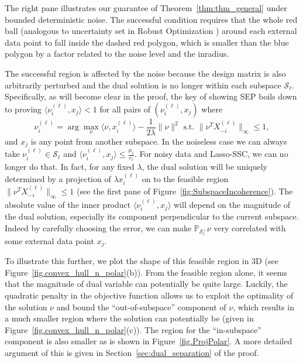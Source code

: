 \documentclass[twoside,11pt]{article}
\numberwithin{equation}{section}
\def\cS{\mathcal{S}}
\begin{document}
The right pane illustrates our guarantee of Theorem~\ref{thm:thm_general} under bounded deterministic noise. The successful condition requires that the whole red ball (analogous to uncertainty set in Robust Optimization \citep{ben1998robust,bertsimas2004price}) around each external data point to fall inside the dashed red polygon, which is smaller than the blue polygon by a factor related to the noise level and the inradius.

The successful region is affected by the noise because the design matrix is also arbitrarily perturbed and the dual solution is no longer within each subspace $\cS_\ell$. Specifically, as will become clear in the proof, the key of showing SEP boils down to proving
$
\langle \nu_i^{(\ell)}, x_j\rangle < 1
$
for all pairs of $(\nu_i^{(\ell)}, x_j)$ where
$$ \nu_i^{(\ell)}=\arg\max_{\nu} \langle \nu, x_i^{(\ell)}\rangle  -\frac{1}{2\lambda}\|\nu\|^2 \text{ s.t. }  \|\nu^TX_{-i}^{(\ell)} \|_\infty \leq 1,$$
and $x_j$ is any point from another subspace. In the noiseless case we can always take $\nu_i^{(\ell)}\in\cS_\ell$ and $\langle \nu_i^{(\ell)}, x_j\rangle \leq \frac{\mu_\ell}{r_\ell}$. For noisy data and Lasso-SSC, we can no longer do that. In fact, for any fixed $\lambda$, the dual solution will be uniquely determined by a projection of $\lambda x_i^{(\ell)}$ on to the feasible region $\|\nu^TX_{-i}^{(\ell)} \|_\infty \leq 1$ (see the first pane of Figure~\ref{fig:SubspaceIncoherence}). The absolute value of the inner product $\langle \nu_i^{(\ell)}, x_j\rangle$ will depend on the magnitude of the dual solution, especially its component perpendicular to the current subspace. Indeed by carefully choosing the error, we can make $\mathbb{P}_{\cS_\ell^{\perp}}\nu$ very correlated with some external data point $x_j$.


To illustrate this further, we plot the shape of this feasible region in 3D (see Figure~\ref{fig.convex_hull_n_polar}(b)). From the feasible region alone, it seems that the magnitude of dual variable can potentially be quite large. Luckily, the quadratic penalty in the objective function allows us to exploit the optimality of the solution $\nu$ and bound the ``out-of-subspace'' component of $\nu$, which results in a much smaller region where the solution can potentially be (given in Figure~\ref{fig.convex_hull_n_polar}(c)). The region for the ``in-subspace'' component is also smaller as is shown in Figure~\ref{fig.ProjPolar}. A more detailed argument of this is given in Section~\ref{sec:dual_separation} of the proof.
\end{document}

